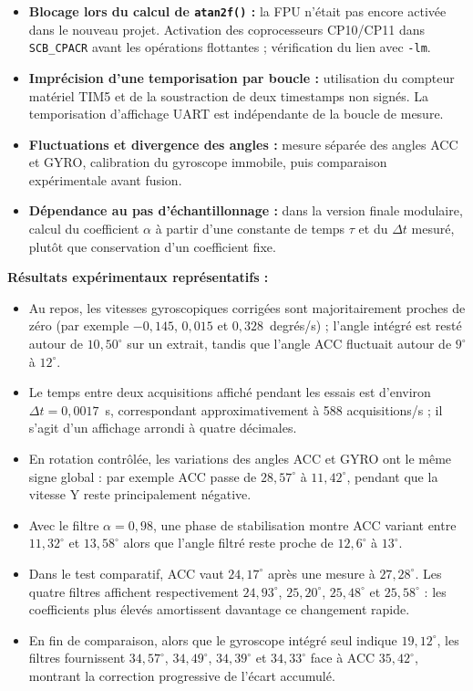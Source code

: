 \documentclass[11pt,a4paper]{article}
\begin{document}
\begin{sessionbox}
		\begin{itemize}
			\item \textbf{Blocage lors du calcul de \texttt{atan2f()} :} la FPU n'était pas encore activée dans le nouveau projet. Activation des coprocesseurs CP10/CP11 dans \texttt{SCB\_CPACR} avant les opérations flottantes ; vérification du lien avec \texttt{-lm}.
			\item \textbf{Imprécision d'une temporisation par boucle :} utilisation du compteur matériel TIM5 et de la soustraction de deux timestamps non signés. La temporisation d'affichage UART est indépendante de la boucle de mesure.
			\item \textbf{Fluctuations et divergence des angles :} mesure séparée des angles ACC et GYRO, calibration du gyroscope immobile, puis comparaison expérimentale avant fusion.
			\item \textbf{Dépendance au pas d'échantillonnage :} dans la version finale modulaire, calcul du coefficient \(\alpha\) à partir d'une constante de temps \(\tau\) et du \(\Delta t\) mesuré, plutôt que conservation d'un coefficient fixe.
		\end{itemize}
		
		\vspace{0.3cm}
		
		\textbf{Résultats expérimentaux représentatifs :}
		
		\begin{itemize}
			\item Au repos, les vitesses gyroscopiques corrigées sont majoritairement proches de zéro (par exemple \(-0{,}145\), \(0{,}015\) et \(0{,}328\)~degrés/s) ; l'angle intégré est resté autour de \(10{,}50^\circ\) sur un extrait, tandis que l'angle ACC fluctuait autour de \(9^\circ\) à \(12^\circ\).
			\item Le temps entre deux acquisitions affiché pendant les essais est d'environ \(\Delta t=0{,}0017\)~s, correspondant approximativement à 588 acquisitions/s ; il s'agit d'un affichage arrondi à quatre décimales.
			\item En rotation contrôlée, les variations des angles ACC et GYRO ont le même signe global : par exemple ACC passe de \(28{,}57^\circ\) à \(11{,}42^\circ\), pendant que la vitesse Y reste principalement négative.
			\item Avec le filtre \(\alpha=0{,}98\), une phase de stabilisation montre ACC variant entre \(11{,}32^\circ\) et \(13{,}58^\circ\) alors que l'angle filtré reste proche de \(12{,}6^\circ\) à \(13^\circ\).
			\item Dans le test comparatif, ACC vaut \(24{,}17^\circ\) après une mesure à \(27{,}28^\circ\). Les quatre filtres affichent respectivement \(24{,}93^\circ\), \(25{,}20^\circ\), \(25{,}48^\circ\) et \(25{,}58^\circ\) : les coefficients plus élevés amortissent davantage ce changement rapide.
			\item En fin de comparaison, alors que le gyroscope intégré seul indique \(19{,}12^\circ\), les filtres fournissent \(34{,}57^\circ\), \(34{,}49^\circ\), \(34{,}39^\circ\) et \(34{,}33^\circ\) face à ACC \(35{,}42^\circ\), montrant la correction progressive de l'écart accumulé.
		\end{itemize}
		

\end{sessionbox}
\end{document}

